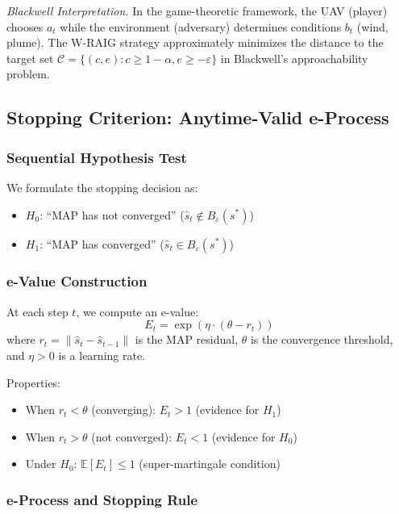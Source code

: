 \textit{Blackwell Interpretation.} In the game-theoretic framework, the UAV (player) chooses $a_t$ while the environment (adversary) determines conditions $b_t$ (wind, plume). The W-RAIG strategy approximately minimizes the distance to the target set $\mathcal{C} = \{(c, e) : c \geq 1-\alpha, e \geq -\varepsilon\}$ in Blackwell's approachability problem.

\subsection{Stopping Criterion: Anytime-Valid e-Process}

\subsubsection{Sequential Hypothesis Test}

We formulate the stopping decision as:
\begin{itemize}
\item $H_0$: ``MAP has not converged'' ($\hat{s}_t \notin B_\varepsilon(s^*)$)
\item $H_1$: ``MAP has converged'' ($\hat{s}_t \in B_\varepsilon(s^*)$)
\end{itemize}

\subsubsection{e-Value Construction}

At each step $t$, we compute an e-value:
\begin{equation}
E_t = \exp\left(\eta \cdot (\theta - r_t)\right)
\label{eq:evalue}
\end{equation}
where $r_t = \|\hat{s}_t - \hat{s}_{t-1}\|$ is the MAP residual, $\theta$ is the convergence threshold, and $\eta > 0$ is a learning rate.

Properties:
\begin{itemize}
\item When $r_t < \theta$ (converging): $E_t > 1$ (evidence for $H_1$)
\item When $r_t > \theta$ (not converged): $E_t < 1$ (evidence for $H_0$)
\item Under $H_0$: $\mathbb{E}[E_t] \leq 1$ (super-martingale condition)
\end{itemize}

\subsubsection{e-Process and Stopping Rule}

